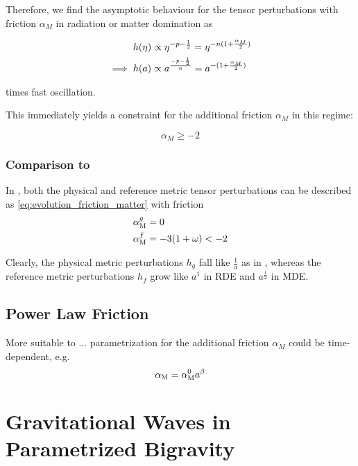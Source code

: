 \documentclass[parskip=half]{scrreprt}
\begin{document}
Therefore, we find the asymptotic behaviour for the tensor perturbations with friction $\alpha_M$ in radiation or matter domination as

\begin{align}
	h(\eta) &\propto \eta^{-p-\frac{1}{2}} = \eta^{-n(1+\frac{\alpha_M}{2})} \\
	\implies h(a) &\propto a^{\frac{-p-\frac{1}{2}}{n}} = a^{-(1+\frac{\alpha_M}{2})}
\end{align}

times fast oscillation.

This immediately yields a constraint for the additional friction $\alpha_M$ in this regime:

\begin{equation}
	\alpha_M \geq -2
\end{equation}


\subsection{Comparison to \cite{Amendola2015}}

In \citep{Amendola2015}, both the physical and reference metric tensor perturbations can be described as \ref{eq:evolution_friction_matter} with friction
\begin{align}
	\alpha_\mathrm{M}^{g} &= 0 \\
	\alpha_\mathrm{M}^{f} &= -3(1+\omega) < -2
\end{align}

Clearly, the physical metric perturbations $h_g$ fall like $\frac{1}{a}$ as in \cosmconstCDM, whereas the reference metric perturbations $h_f$ grow like $a^1$ in RDE and $a^\frac{1}{2}$ in MDE.


\section{Power Law Friction}

More suitable to ... parametrization for the additional friction $\alpha_M$ could be time-dependent, e.g.
\begin{equation}
	\alpha_\mathrm{M} = \alpha_\mathrm{M}^0 a^\beta
\end{equation}




\chapter{Gravitational Waves in Parametrized Bigravity}
\end{document}
